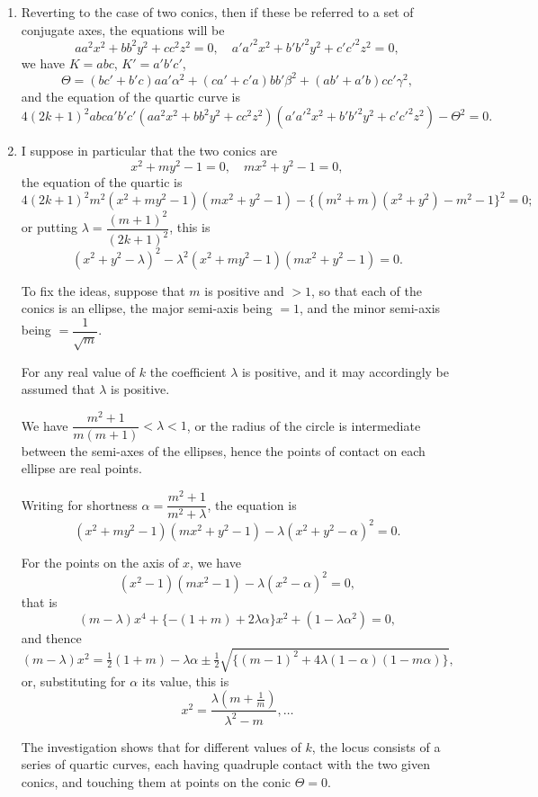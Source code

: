 \documentclass[12pt,a4paper]{article}
\theoremstyle{plain}
\theoremstyle{definition}
\theoremstyle{remark}
\begin{document}
\begin{enumerate}[label=\arabic*.]
\item Reverting to the case of two conics, then if these be referred to a set of conjugate axes, the equations will be
\[aa^2x^2 + bb^2y^2 + cc^2z^2 = 0, \quad a'a'^2x^2 + b'b'^2y^2 + c'c'^2z^2 = 0,\]
we have $K = abc$, $K' = a'b'c'$,
\[\Theta = (bc' + b'c)aa'\alpha^2 + (ca' + c'a)bb'\beta^2 + (ab' + a'b)cc'\gamma^2,\]
and the equation of the quartic curve is
\[4(2k+1)^2 abc a'b'c' (aa^2x^2 + bb^2y^2 + cc^2z^2)(a'a'^2x^2 + b'b'^2y^2 + c'c'^2z^2) - \Theta^2 = 0.\]

\item I suppose in particular that the two conics are
\[x^2 + my^2 - 1 = 0, \quad mx^2 + y^2 - 1 = 0,\]
the equation of the quartic is
\[4(2k+1)^2 m^2 (x^2 + my^2 - 1)(mx^2 + y^2 - 1) - \{(m^2 + m)(x^2 + y^2) - m^2 - 1\}^2 = 0;\]
or putting $\lambda = \dfrac{(m+1)^2}{(2k+1)^2}$, this is
\[(x^2 + y^2 - \lambda)^2 - \lambda^2(x^2 + my^2 - 1)(mx^2 + y^2 - 1) = 0.\]

To fix the ideas, suppose that $m$ is positive and $> 1$, so that each of the conics is an ellipse, the major semi-axis being $= 1$, and the minor semi-axis being $= \dfrac{1}{\sqrt{m}}$.

For any real value of $k$ the coefficient $\lambda$ is positive, and it may accordingly be assumed that $\lambda$ is positive.

We have $\dfrac{m^2 + 1}{m(m+1)} < \lambda < 1$, or the radius of the circle is intermediate between the semi-axes of the ellipses, hence the points of contact on each ellipse are real points.

Writing for shortness $\alpha = \dfrac{m^2 + 1}{m^2 + \lambda}$, the equation is
\[(x^2 + my^2 - 1)(mx^2 + y^2 - 1) - \lambda(x^2 + y^2 - \alpha)^2 = 0.\]

For the points on the axis of $x$, we have
\[(x^2 - 1)(mx^2 - 1) - \lambda(x^2 - \alpha)^2 = 0,\]
that is
\[(m - \lambda)x^4 + \{-(1+m) + 2\lambda\alpha\}x^2 + (1 - \lambda\alpha^2) = 0,\]
and thence
\[(m - \lambda)x^2 = \tfrac{1}{2}(1 + m) - \lambda\alpha \pm \tfrac{1}{2}\sqrt{\{(m-1)^2 + 4\lambda(1-\alpha)(1-m\alpha)\}},\]
or, substituting for $\alpha$ its value, this is
\[x^2 = \frac{\lambda(m + \tfrac{1}{m})}{\lambda^2 - m}, \ldots\]

The investigation shows that for different values of $k$, the locus consists of a series of quartic curves, each having quadruple contact with the two given conics, and touching them at points on the conic $\Theta = 0$.
\end{enumerate}
\end{document}
